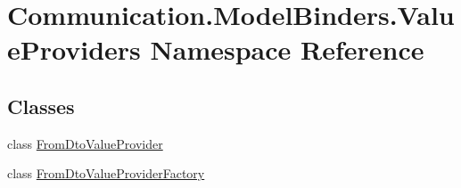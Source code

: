 \hypertarget{namespace_communication_1_1_model_binders_1_1_value_providers}{}\section{Communication.\+Model\+Binders.\+Value\+Providers Namespace Reference}
\label{namespace_communication_1_1_model_binders_1_1_value_providers}
\subsection*{Classes}
\begin{DoxyCompactItemize}
\item 
class \mbox{\hyperlink{class_communication_1_1_model_binders_1_1_value_providers_1_1_from_dto_value_provider}{From\+Dto\+Value\+Provider}}
\item 
class \mbox{\hyperlink{class_communication_1_1_model_binders_1_1_value_providers_1_1_from_dto_value_provider_factory}{From\+Dto\+Value\+Provider\+Factory}}
\end{DoxyCompactItemize}
